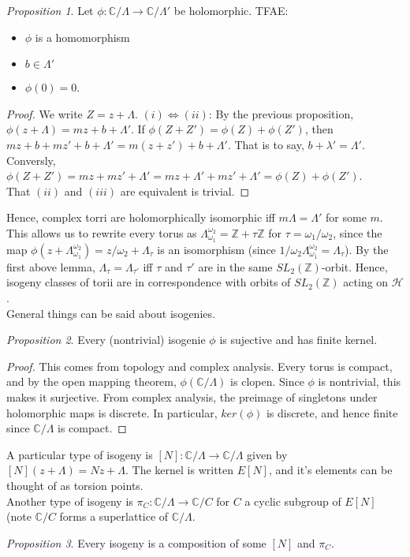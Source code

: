 \documentclass[11pt]{article}
\theoremstyle{plain}
\theoremstyle{definition}
\theoremstyle{example}
\theoremstyle{remark}
\theoremstyle{lemma}
\theoremstyle{proposition}
\newtheorem{proposition}{Proposition}[section]
\theoremstyle{Problem}
\theoremstyle{Solution}
\theoremstyle{theorem}
\theoremstyle{corollary}
\begin{document}
\begin{proposition}
Let $\phi : \mathbb{C}/\Lambda \to \mathbb{C}/\Lambda'$ be holomorphic. TFAE:
\begin{itemize}
\item $\phi$ is a homomorphism
\item $b\in\Lambda'$
\item $\phi(0) = 0$.
\end{itemize}
\end{proposition}
\begin{proof}
We write $Z = z+\Lambda$.
$(i)\iff (ii)$: By the previous proposition, $\phi(z+\Lambda) = mz+b+\Lambda'$. If $\phi(Z+Z') = \phi(Z)+\phi(Z')$, then $mz+b + mz'+b + \Lambda' = m(z+z') + b + \Lambda'$. That is to say, $b+\lambda' = \Lambda'$. Conversly, $\phi(Z+Z') = mz+mz'+\Lambda' = mz+\Lambda' + mz' +\Lambda' = \phi(Z) + \phi(Z')$.\\
That $(ii)$ and $(iii)$ are equivalent is trivial.
\end{proof}
Hence, complex torri are holomorphically isomorphic iff $m\Lambda = \Lambda'$ for some $m$. This allows us to rewrite every torus as $\Lambda_{\omega_1}^{\omega_2} = \mathbb{Z}+\tau\mathbb{Z}$ for $\tau = \omega_1/\omega_2$, since the map $\phi(z+\Lambda_{\omega_1}^{\omega_2}) = z/\omega_2 + \Lambda_\tau$ is an isomorphism (since $1/\omega_2\Lambda_{\omega_1}^{\omega_2} = \Lambda_\tau$). By the first above lemma, $\Lambda_\tau = \Lambda_{\tau'}$ iff $\tau$ and $\tau'$ are in the same $SL_2(\mathbb{Z})$-orbit. Hence, isogeny classes of torii are in correspondence with orbits of $SL_2(\mathbb{Z})$ acting on $\mathcal{H}$.\\
General things can be said about isogenies.
\begin{proposition}
Every (nontrivial) isogenie $\phi$ is sujective and has finite kernel.
\end{proposition}
\begin{proof}
This comes from topology and complex analysis. Every torus is compact, and by the open mapping theorem, $\phi(\mathbb{C}/\Lambda)$ is clopen. Since $\phi$ is nontrivial, this makes it surjective. From complex analysis, the preimage of singletons under holomorphic maps is discrete. In particular, $ker(\phi)$ is discrete, and hence finite since $\mathbb{C}/\Lambda$ is compact.
\end{proof}
A particular type of isogeny is $[N]:\mathbb{C}/\Lambda \to \mathbb{C}/\Lambda$ given by $[N](z+\Lambda) = Nz + \Lambda$. The kernel is written $E[N]$, and it's elements can be thought of as torsion points.\\
Another type of isogeny is $\pi_C:\mathbb{C}/\Lambda \to \mathbb{C}/C$ for $C$ a cyclic subgroup of $E[N]$ (note $\mathbb{C}/C$ forms a superlattice of $\mathbb{C}/\Lambda$.\\
\begin{proposition}
Every isogeny is a composition of some $[N]$ and $\pi_C$.
\end{proposition}
\end{document}
